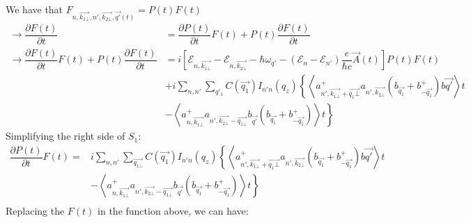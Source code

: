 \documentclass{article}
\begin{document}
We have that $F_{n, \vec{k_{1\bot}}, n',\vec{k_{2\bot}},\vec{q'}(t)} = P(t) F(t)$
\begin{align*}
    \rightarrow \dfrac{\partial F(t)}{\partial t } &= \dfrac{\partial P (t)}{\partial t} F (t) + P(t) \dfrac{\partial F(t)}{\partial t}\\
    \rightarrow \dfrac{\partial F(t)}{\partial t} F(t) + P(t) \dfrac{\partial F(t)}{\partial t} & = i \left[\mathcal{E}_{n,\vec{k_{1\bot}}}- \mathcal{E}_{n,\vec{k_{2\bot}}}-\hbar\omega_{q'} - \left(\mathcal{E}_n -\mathcal{E}_{n'}\right)\dfrac{e}{\hbar c}\vec{A}(t)\right] P(t) F(t) \\
    & + i \sum_{n,n'} \sum_{q'_1} C \left(\vec{q_1}\right)I_{n'n}\left(q_z\right)\left\{\left\langle a^+_{n',\vec{k_{1\bot}}+\vec{q_1\bot}}a_{n',\vec{k_{2\bot}}}\left(b_{\vec{q_1}}+b^+_{-\vec{q_1}}\right)b\vec{q'}\right\rangle t \right. \\
    & \left.-\left\langle a^+_{n,\vec{k_{1\bot}}} a_{n',\vec{k_{2\bot}}-\vec{q_{1\bot}}}b_{\vec{q'}}\left(b_{\vec{q_1}}+ b^+_{-\vec{q_1}}\right)\right\rangle t\right\}
\end{align*}
Simplifying the right side of $S_1$:
\begin{align*}
 \dfrac{\partial P(t)}{\partial t} F(t) = & i \sum_{n,n'}\sum_{\vec{q_{1\bot}}} C \left(\vec{q_1}\right) I_{n'n} \left(q_z\right) \left\{\left\langle a^+_{n',\vec{k_{1\bot}}+\vec{q_1\bot}}a_{n',\vec{k_{2\bot}}}\left(b_{\vec{q_1}}+b^+_{-\vec{q_1}}\right)b\vec{q'}\right\rangle t\right. \\
    & \left.-\left\langle a^+_{n,\vec{k_{1\bot}}} a_{n',\vec{k_{2\bot}}-\vec{q_{1\bot}}}b_{\vec{q'}}\left(b_{\vec{q_1}}+ b^+_{-\vec{q_1}}\right)\right\rangle t\right\} \\
\end{align*}
Replacing the $F(t)$ in the function above, we can have: 
\end{document}
